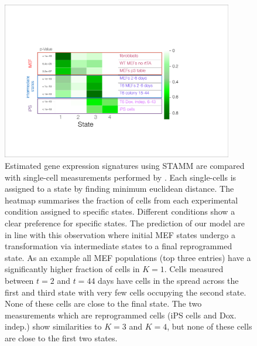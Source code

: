 \begin{figure}
  \centering
  \includegraphics[width=0.9\textwidth]{pics/Heat_single_cells.pdf}
  \caption{Estimated gene expression signatures using STAMM are compared with single-cell measurements performed by \cite{Buganim:2012hp}. Each single-cells is assigned to a state by finding minimum euclidean distance. The heatmap summarises the fraction of cells from each experimental condition assigned to specific states. Different conditions show a clear preference for specific states. The prediction of our model are in line with this observation where initial MEF states undergo a transformation via intermediate states to a final reprogrammed state. As an example all MEF populations (top three entries) have a significantly higher fraction of cells in $K=1$. Cells measured between $t=2$ and $t=44$ days have cells in the spread across the first and third state with very few cells occupying the second state. None of these cells are close to the final state. The two measurements which are reprogrammed cells (iPS cells and Dox. indep.) show similarities to $K=3$ and $K=4$, but none of these cells are close to the first two states.
}
  \label{fig:buganim-heat}
\end{figure}


